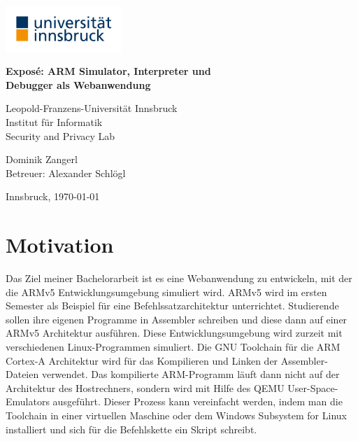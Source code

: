 \documentclass[a4paper, 11pt, onecolumn]{article}
\providecommand{\keywords}[1]
{
  \noindent \textbf{Schlüsselwörter } #1
}
\begin{document}
\renewcommand{\abstractname}{Kurzfassung}
    \begin{center}

        \includegraphics[width=0.33\textwidth]{data/uibk} 
        
		\LARGE
        \textbf{Exposé: ARM Simulator, Interpreter und\\Debugger als Webanwendung\\}
        
		\vspace{0.2cm}        
            
        \large
        Leopold-Franzens-Universität Innsbruck\\
        Institut für Informatik\\
		Security and Privacy Lab
		
		\vspace{0.4cm}   
		
		\Large  
        Dominik Zangerl\\
		Betreuer: Alexander Schlögl  
                
        \vspace{0.4cm}
        
        \large    
        Innsbruck, \today
           
    \end{center}
    
%
%
%

\section{Motivation}

Das Ziel meiner Bachelorarbeit ist es eine Webanwendung zu entwickeln, mit der die ARMv5 Entwicklungsumgebung simuliert wird. ARMv5 \cite{arm:2005} wird im ersten Semester als Beispiel für eine Befehlssatzarchitektur unterrichtet. Studierende sollen ihre eigenen Programme in Assembler \cite{assembly} schreiben und diese dann auf einer ARMv5 Architektur ausführen. Diese Entwicklungsumgebung wird zurzeit mit verschiedenen Linux-Programmen simuliert. Die GNU Toolchain für die ARM Cortex-A Architektur \cite{gnutoolchain} wird für das Kompilieren und Linken der Assembler-Dateien verwendet. Das kompilierte ARM-Programm läuft dann nicht auf der Architektur des Hostrechners, sondern wird mit Hilfe des QEMU User-Space-Emulators \cite{qemu} ausgeführt. Dieser Prozess kann vereinfacht werden, indem man die Toolchain in einer virtuellen Maschine oder dem Windows Subsystem for Linux \cite{wsl} installiert und sich für die Befehlskette ein Skript schreibt.
\end{document}
